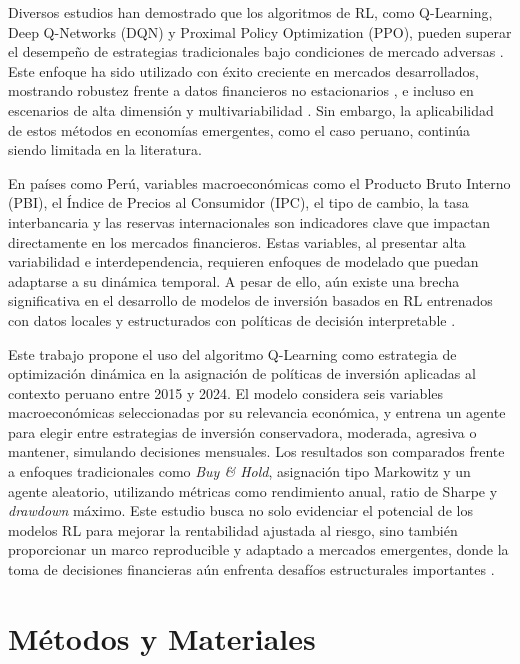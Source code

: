\documentclass[conference]{IEEEtran}
\begin{document}
	Diversos estudios han demostrado que los algoritmos de RL, como Q-Learning, Deep Q-Networks (DQN) y Proximal Policy Optimization (PPO), pueden superar el desempeño de estrategias tradicionales bajo condiciones de mercado adversas \cite{deng2017deep, rezaei2025taxonomy, jiang2017framework}. Este enfoque ha sido utilizado con éxito creciente en mercados desarrollados, mostrando robustez frente a datos financieros no estacionarios \cite{yang2020deep, moody2001learning}, e incluso en escenarios de alta dimensión y multivariabilidad \cite{garud2025fintech}. Sin embargo, la aplicabilidad de estos métodos en economías emergentes, como el caso peruano, continúa siendo limitada en la literatura.
	
	En países como Perú, variables macroeconómicas como el Producto Bruto Interno (PBI), el Índice de Precios al Consumidor (IPC), el tipo de cambio, la tasa interbancaria y las reservas internacionales son indicadores clave que impactan directamente en los mercados financieros. Estas variables, al presentar alta variabilidad e interdependencia, requieren enfoques de modelado que puedan adaptarse a su dinámica temporal. A pesar de ello, aún existe una brecha significativa en el desarrollo de modelos de inversión basados en RL entrenados con datos locales y estructurados con políticas de decisión interpretable \cite{filos2019trading, unnikrishnan2024sentiment}.
	
	Este trabajo propone el uso del algoritmo Q-Learning como estrategia de optimización dinámica en la asignación de políticas de inversión aplicadas al contexto peruano entre 2015 y 2024. El modelo considera seis variables macroeconómicas seleccionadas por su relevancia económica, y entrena un agente para elegir entre estrategias de inversión conservadora, moderada, agresiva o mantener, simulando decisiones mensuales. Los resultados son comparados frente a enfoques tradicionales como \textit{Buy \& Hold}, asignación tipo Markowitz y un agente aleatorio, utilizando métricas como rendimiento anual, ratio de Sharpe y \textit{drawdown} máximo. Este estudio busca no solo evidenciar el potencial de los modelos RL para mejorar la rentabilidad ajustada al riesgo, sino también proporcionar un marco reproducible y adaptado a mercados emergentes, donde la toma de decisiones financieras aún enfrenta desafíos estructurales importantes \cite{hambly2023advances}.
	
	\section{Métodos y Materiales}
	
\end{document}
